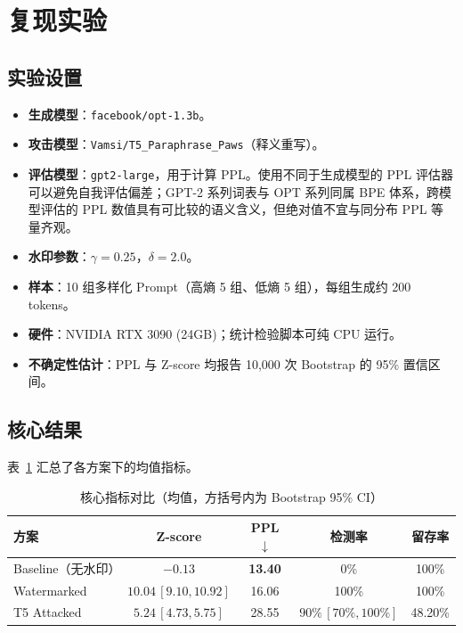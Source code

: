 \documentclass[11pt,a4paper]{article}
\begin{document}
\section{复现实验}

\subsection{实验设置}
\begin{itemize}
    \item \textbf{生成模型}：\texttt{facebook/opt-1.3b}。
    \item \textbf{攻击模型}：\texttt{Vamsi/T5\_Paraphrase\_Paws}（释义重写）。
    \item \textbf{评估模型}：\texttt{gpt2-large}，用于计算 PPL。使用不同于生成模型的 PPL 评估器可以避免自我评估偏差；GPT-2 系列词表与 OPT 系列同属 BPE 体系，跨模型评估的 PPL 数值具有可比较的语义含义，但绝对值不宜与同分布 PPL 等量齐观。
    \item \textbf{水印参数}：$\gamma=0.25$，$\delta=2.0$。
    \item \textbf{样本}：10 组多样化 Prompt（高熵 5 组、低熵 5 组），每组生成约 200 tokens。
    \item \textbf{硬件}：NVIDIA RTX 3090 (24GB)；统计检验脚本可纯 CPU 运行。
    \item \textbf{不确定性估计}：PPL 与 Z-score 均报告 10,000 次 Bootstrap 的 95\% 置信区间。
\end{itemize}

\subsection{核心结果}
表~\ref{tab:detailed_results} 汇总了各方案下的均值指标。

\begin{table}[ht]
    \centering
    \caption{核心指标对比（均值，方括号内为 Bootstrap 95\% CI）}
    \label{tab:detailed_results}
    \vspace{0.5em}
    \begin{tabular}{lcccc}
        \toprule
        方案 & Z-score & PPL $\downarrow$ & 检测率 & 留存率 \\
        \midrule
        Baseline（无水印） & $-0.13$ & \textbf{13.40} & 0\% & 100\% \\
        Watermarked & $\mathbf{10.04}\, [9.10, 10.92]$ & 16.06 & 100\% & 100\% \\
        T5 Attacked & $5.24\, [4.73, 5.75]$ & 28.55 & $90\%\, [70\%, 100\%]$ & 48.20\% \\
        \bottomrule
    \end{tabular}
\end{table}
\end{document}
